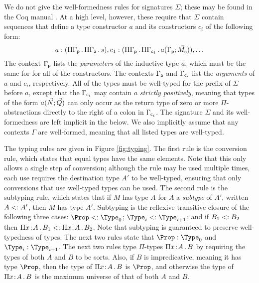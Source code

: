 \documentclass{article}
\begin{document}
We do not give the well-formedness rules for signatures $\Sigma$;
these may be found in the Coq manual \cite{coq}. At a high level,
however, these require that $\Sigma$ contain sequences that define a
type constructor $a$ and its constructors $c_i$ of the following form:
\[
a:(\pigamma{\Gammap}{\pigamma{\Gammaa}{s}}),
c_1:(\pigamma{\Gammap}{\pigamma{\Gammaci[1]}{\ctorapp{a}{\Gammap}{\vec{M_c}}}}),
\ldots
\]
The context $\Gammap$ lists the \emph{parameters} of the inductive
type $a$, which must be the same for for all of the constructors.  The
contexts $\Gammaa$ and $\Gammaci[i]$ list the \emph{arguments} of $a$
and $c_i$, respectively. All of the types must be well-typed for the
prefix of $\Sigma$ before $a$, except that the $\Gammaci[i]$ may
contain $a$ \emph{strictly positively}, meaning that types of the form
$\ctorapp{a}{\vec{N}}{\vec{Q}}$ can only occur as the return type
of zero or more $\Pi$-abstractions directly to the right
of a colon in $\Gammaci[i]$. The signature $\Sigma$ and its
well-formedness are left implicit in the below.
We also implicitly assume that any contexts $\Gamma$ are well-formed,
meaning that all listed types are well-typed.



The typing rules are given in Figure \ref{fig:typing}. The first rule
is the conversion rule, which states that equal types have the same
elements. Note that this only allows a single step of conversion;
although the rule may be used multiple times, each use requires the
destination type $A'$ to be well-typed, ensuring that only conversions
that use well-typed types can be used.  The second rule is the
subtyping rule, which states that if $M$ has type $A$ for $A$ a
\emph{subtype} of $A'$, written $A\subtype A'$, then $M$ has type
$A'$.  Subtyping is the reflexive-transitive closure of the following
three cases: $\Prop\subtype\Type_0$; $\Type_i\subtype\Type_{i+1}$; and
if $B_1\subtype B_2$ then
$\pitype{x}{A}{B_1}\subtype\pitype{x}{A}{B_2}$.  Note that subtyping
is guaranteed to preserve well-typedness of types.  The next two rules
state that $\Prop:\Type_0$ and $\Type_i:\Type_{i+1}$. The next two
rules type $\Pi$-types $\pitype{x}{A}{B}$ by requiring the types of
both $A$ and $B$ to be sorts. Also, if $B$ is impredicative, meaning
it has type $\Prop$, then the type of $\pitype{x}{A}{B}$ is $\Prop$,
and otherwise the type of $\pitype{x}{A}{B}$ is the maximum universe
of that of both $A$ and $B$.
\end{document}
